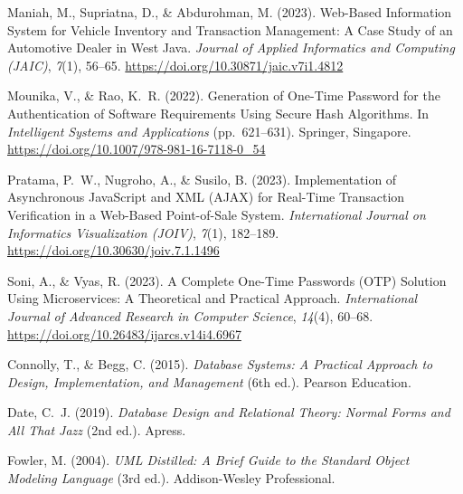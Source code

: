 \documentclass[11pt, a5paper]{article}
\begin{document}
\begin{enumerate}[label={[\arabic*]}, leftmargin=*, itemsep=8pt]
  \item %
        Maniah, M., Supriatna, D., \& Abdurohman, M. (2023).
        Web-Based Information System for Vehicle Inventory and
        Transaction Management: A Case Study of an Automotive
        Dealer in West Java.
        \textit{Journal of Applied Informatics and Computing
        (JAIC)}, \textit{7}(1), 56--65.
        \url{https://doi.org/10.30871/jaic.v7i1.4812}

  \item %
        Mounika, V., \& Rao, K.~R. (2022).
        Generation of One-Time Password for the Authentication
        of Software Requirements Using Secure Hash Algorithms.
        In \textit{Intelligent Systems and Applications} (pp.\
        621--631). Springer, Singapore.
        \url{https://doi.org/10.1007/978-981-16-7118-0_54}

  \item %
        Pratama, P.~W., Nugroho, A., \& Susilo, B. (2023).
        Implementation of Asynchronous JavaScript and XML (AJAX)
        for Real-Time Transaction Verification in a Web-Based
        Point-of-Sale System.
        \textit{International Journal on Informatics Visualization
        (JOIV)}, \textit{7}(1), 182--189.
        \url{https://doi.org/10.30630/joiv.7.1.1496}

  \item %
        Soni, A., \& Vyas, R. (2023).
        A Complete One-Time Passwords (OTP) Solution Using
        Microservices: A Theoretical and Practical Approach.
        \textit{International Journal of Advanced Research in
        Computer Science}, \textit{14}(4), 60--68.
        \url{https://doi.org/10.26483/ijarcs.v14i4.6967}


  \item %
        Connolly, T., \& Begg, C. (2015).
        \textit{Database Systems: A Practical Approach to Design,
        Implementation, and Management} (6th ed.).
        Pearson Education.

  \item %
        Date, C.~J. (2019).
        \textit{Database Design and Relational Theory: Normal Forms
        and All That Jazz} (2nd ed.).
        Apress.

  \item %
        Fowler, M. (2004).
        \textit{UML Distilled: A Brief Guide to the Standard Object
        Modeling Language} (3rd ed.).
        Addison-Wesley Professional.


\end{enumerate}
\end{document}
